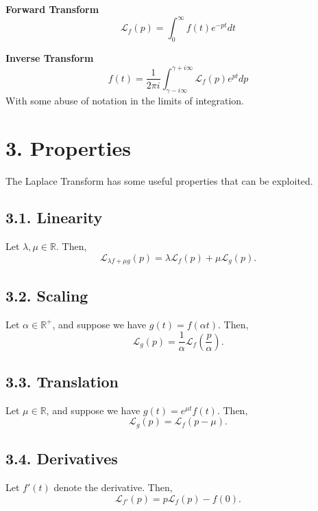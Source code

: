 \documentclass[11pt]{article}
\begin{document}
\textbf{Forward Transform}
\begin{equation*}
    \mathcal{L}_f (p) = \int_{0}^{\infty} f(t) e^{-pt} dt
\end{equation*}

\textbf{Inverse Transform}
\begin{equation*}
    f(t) = \frac{1}{2 \pi i} \int_{\gamma - i\infty}^{\gamma + i\infty} \mathcal{L}_f (p) e^{pt} dp
\end{equation*}
With some abuse of notation in the limits of integration.

\newpage

\section*{3. Properties}
The Laplace Transform has some useful properties that can be exploited.

\subsection*{3.1. Linearity}
Let $\lambda, \mu \in \mathbb{R}$. Then,
\begin{equation}
    \mathcal{L}_{\lambda f+\mu g} (p) = \lambda \mathcal{L}_{f} (p) + \mu \mathcal{L}_{g} (p).
\end{equation}

\subsection*{3.2. Scaling}
Let $\alpha \in \mathbb{R}^{+}$, and suppose we have $g(t) = f(\alpha t)$. Then, 
\begin{equation}
    \mathcal{L}_g (p) = \frac{1}{\alpha} \mathcal{L}_f \left(\frac{p}{\alpha}\right).
\end{equation}

\subsection*{3.3. Translation}
Let $\mu \in \mathbb{R}$, and suppose we have $g(t) = e^{\mu t} f(t)$. Then, 
\begin{equation}
    \mathcal{L}_g (p) = \mathcal{L}_f(p - \mu).
\end{equation}

\subsection*{3.4. Derivatives}
Let $f'(t)$ denote the derivative. Then, 
\begin{equation}
    \mathcal{L}_{f'} (p) = p \mathcal{L}_f(p) - f(0).
\end{equation}
\end{document}
